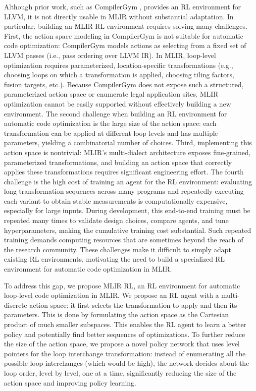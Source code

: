 \documentclass[10pt,twocolumn]{article}
\begin{document}
Although prior work, such as CompilerGym \cite{ref13}, provides an RL environment for LLVM, it is not directly usable in MLIR without substantial adaptation. In particular, building an MLIR RL environment requires solving many challenges. First, the action space modeling in CompilerGym is not suitable for automatic code optimization: CompilerGym models actions as selecting from a fixed set of LLVM passes (i.e., pass ordering over LLVM IR). In MLIR, loop-level optimization requires parameterized, location-specific transformations (e.g., choosing loops on which a transformation is applied, choosing tiling factors, fusion targets, etc.). Because CompilerGym does not expose such a structured, parameterized action space or enumerate legal application sites, MLIR optimization cannot be easily supported without effectively building a new environment. The second challenge when building an RL environment for automatic code optimization is the large size of the action space: each transformation can be applied at different loop levels and has multiple parameters, yielding a combinatorial number of choices. Third, implementing this action space is nontrivial: MLIR's multi-dialect architecture exposes fine-grained, parameterized transformations, and building an action space that correctly applies these transformations requires significant engineering effort. The fourth challenge is the high cost of training an agent for the RL environment: evaluating long transformation sequences across many programs and repeatedly executing each variant to obtain stable measurements is computationally expensive, especially for large inputs. During development, this end-to-end training must be repeated many times to validate design choices, compare agents, and tune hyperparameters, making the cumulative training cost substantial. Such repeated training demands computing resources that are sometimes beyond the reach of the research community. These challenges make it difficult to simply adapt existing RL environments, motivating the need to build a specialized RL environment for automatic code optimization in MLIR.

To address this gap, we propose MLIR RL, an RL environment for automatic loop-level code optimization in MLIR. We propose an RL agent with a multi-discrete action space: it first selects the transformation to apply and then its parameters. This is done by formulating the action space as the Cartesian product of much smaller subspaces. This enables the RL agent to learn a better policy and potentially find better sequences of optimizations. To further reduce the size of the action space, we propose a novel policy network that uses level pointers for the loop interchange transformation: instead of enumerating all the possible loop interchanges (which would be high), the network decides about the loop order, level by level, one at a time, significantly reducing the size of the action space and improving policy learning.
\end{document}
